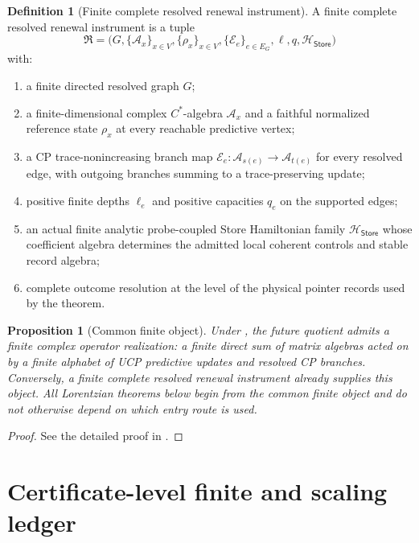 \documentclass[11pt]{article}
\newtheorem{proposition}[theorem]{Proposition}
\theoremstyle{definition}
\newtheorem{definition}[theorem]{Definition}
\theoremstyle{remark}
\newcommand{\A}{\mathcal A}
\newcommand{\Store}{\mathsf{Store}}
\begin{document}
\begin{definition}[Finite complete resolved renewal instrument]
A finite complete resolved renewal instrument is a tuple
\[
 \mathfrak R=
 \bigl(G,\{\A_x\}_{x\in V},\{\rho_x\}_{x\in V},
       \{\mathcal E_e\}_{e\in E_G},\ell,q,\mathscr H_{\Store}\bigr)
\]
with:
\begin{enumerate}[label=\textup{(\roman*)},leftmargin=2.6em]
\item a finite directed resolved graph $G$;
\item a finite-dimensional complex $C^*$-algebra $\A_x$ and a faithful
      normalized reference state $\rho_x$ at every reachable predictive vertex;
\item a CP trace-nonincreasing branch map
      $\mathcal E_e:\A_{s(e)}\to\A_{t(e)}$ for every resolved edge, with outgoing
      branches summing to a trace-preserving update;
\item positive finite depths $\ell_e$ and positive capacities $q_e$ on the
      supported edges;
\item an actual finite analytic probe-coupled Store Hamiltonian family
      $\mathscr H_{\Store}$ whose coefficient algebra determines the admitted
      local coherent controls and stable record algebra;
\item complete outcome resolution at the level of the physical pointer records
      used by the theorem.
\end{enumerate}
\end{definition}

\begin{proposition}[Common finite object]
\label{prop:common-object}
Under , the future quotient admits a finite complex
operator realization: a finite direct sum of matrix algebras acted on by a
finite alphabet of UCP predictive updates and resolved CP branches.  Conversely,
a finite complete resolved renewal instrument already supplies this object.
All Lorentzian theorems below begin from the common finite object and do not
otherwise depend on which entry route is used.
\end{proposition}

\begin{proof}
See the detailed proof in .
\end{proof}

\section{Certificate-level finite and scaling ledger}
\end{document}
